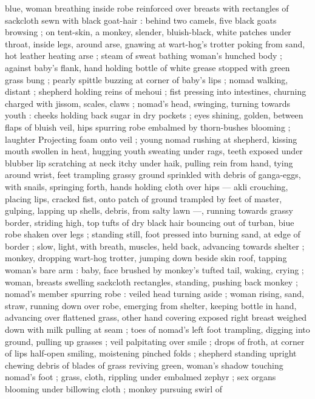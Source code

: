 blue, woman breathing inside robe reinforced over breasts with 
rectangles of sackcloth sewn with black goat-hair : behind two 
camels, five black goats browsing ; on tent-skin, a monkey, slender, 
bluish-black, white patches under throat, inside legs, around arse, 
gnawing at wart-hog's trotter poking from sand, hot leather heating 
arse ; steam of sweat bathing woman's hunched body ; against 
baby's flank, hand holding bottle of white grease stopped with green 
grass bung ; pearly spittle buzzing at corner of baby's lips ; nomad 
walking, distant ; shepherd holding reins of mehoui ; fist pressing 
into intestines, churning charged with jissom, scales, claws ; nomad's 
head, swinging, turning towards youth : cheeks holding back sugar 
in dry pockets ; eyes shining, golden, between flaps of bluish veil, 
hips spurring robe embalmed by thorn-bushes blooming ; laughter 
Projecting foam onto veil ; young nomad rushing at shepherd, kissing 
mouth swollen in heat, hugging youth sweating under rags, teeth 
exposed under blubber lip scratching at neck itchy under haik, 
pulling rein from hand, tying around wrist, feet trampling grassy 
ground sprinkled with debris of ganga-eggs, with snails, springing 
forth, hands holding cloth over hips --- akli crouching, placing lips, 
cracked fist, onto patch of ground trampled by feet of master, 
gulping, lapping up shells, debris, from salty lawn ---, running 
towards grassy border, striding high, top tufts of dry black hair 
bouncing out of turban, biue robe shaken over legs ; standing still, 
foot pressed into burning sand, at edge of border ; slow, light, with 
breath, muscles, held back, advancing towards shelter ; monkey, 
dropping wart-hog trotter, jumping down beside skin roof, tapping 
woman's bare arm : baby, face brushed by monkey's tufted tail, 
waking, crying ; woman, breasts swelling sackcloth rectangles, 
standing, pushing back monkey ; nomad's member spurring robe : 
veiled head turning aside ; woman rising, sand, straw, running down 
over robe, emerging from shelter, keeping bottle in hand, advancing 
over flattened grass, other hand covering exposed right breast 
weighed down with milk pulling at seam ; toes of nomad's left foot 
trampling, digging into ground, pulling up grasses ; veil palpitating 
over smile ; drops of froth, at corner of lips half-open smiling, 
moistening pinched folds ; shepherd standing upright chewing debris 
of blades of grass reviving green, woman's shadow touching 
nomad's foot ; grass, cloth, rippling under embalmed zephyr ; sex 
organs blooming under billowing cloth ; monkey pursuing swirl of 

